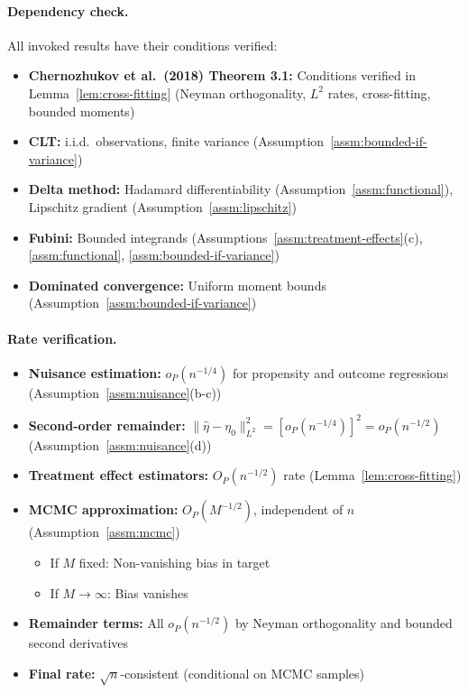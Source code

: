 \paragraph{Dependency check.}
All invoked results have their conditions verified:
\begin{itemize}
\item \textbf{Chernozhukov et al.\ (2018) Theorem 3.1:} Conditions verified in Lemma~\ref{lem:cross-fitting} (Neyman orthogonality, $L^2$ rates, cross-fitting, bounded moments)
\item \textbf{CLT:} i.i.d.\ observations, finite variance (Assumption~\ref{assm:bounded-if-variance})
\item \textbf{Delta method:} Hadamard differentiability (Assumption~\ref{assm:functional}), Lipschitz gradient (Assumption~\ref{assm:lipschitz})
\item \textbf{Fubini:} Bounded integrands (Assumptions~\ref{assm:treatment-effects}(c), \ref{assm:functional}, \ref{assm:bounded-if-variance})
\item \textbf{Dominated convergence:} Uniform moment bounds (Assumption~\ref{assm:bounded-if-variance})
\end{itemize}

\paragraph{Rate verification.}
\begin{itemize}
\item \textbf{Nuisance estimation:} $o_P(n^{-1/4})$ for propensity and outcome regressions (Assumption~\ref{assm:nuisance}(b-c))
\item \textbf{Second-order remainder:} $\|\hat{\eta} - \eta_0\|_{L^2}^2 = [o_P(n^{-1/4})]^2 = o_P(n^{-1/2})$ (Assumption~\ref{assm:nuisance}(d))
\item \textbf{Treatment effect estimators:} $O_P(n^{-1/2})$ rate (Lemma~\ref{lem:cross-fitting})
\item \textbf{MCMC approximation:} $O_P(M^{-1/2})$, independent of $n$ (Assumption~\ref{assm:mcmc})
  \begin{itemize}
  \item If $M$ fixed: Non-vanishing bias in target
  \item If $M \to \infty$: Bias vanishes
  \end{itemize}
\item \textbf{Remainder terms:} All $o_P(n^{-1/2})$ by Neyman orthogonality and bounded second derivatives
\item \textbf{Final rate:} $\sqrt{n}$-consistent (conditional on MCMC samples)
\end{itemize}

